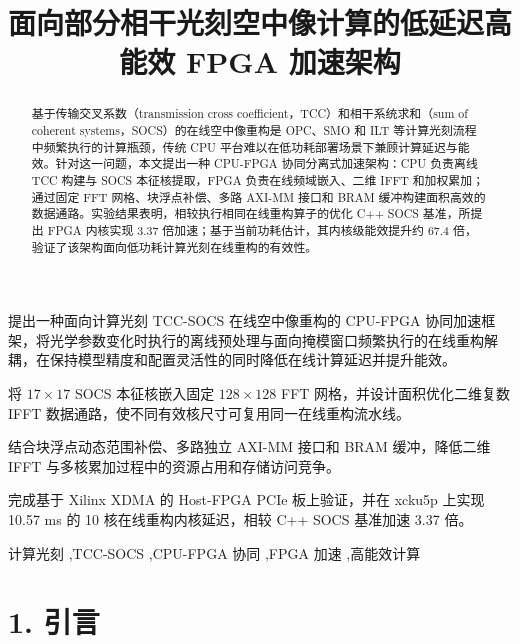 \documentclass[
  preprint]{elsarticle}
\title{面向部分相干光刻空中像计算的低延迟高能效 FPGA 加速架构}
\author{}
\date{}
\begin{document}
\begin{frontmatter}
\maketitle

\begin{highlights}

\item
  提出一种面向计算光刻 TCC-SOCS 在线空中像重构的 CPU-FPGA
  协同加速框架，将光学参数变化时执行的离线预处理与面向掩模窗口频繁执行的在线重构解耦，在保持模型精度和配置灵活性的同时降低在线计算延迟并提升能效。
\item
  将 \(17 \times 17\) SOCS 本征核嵌入固定 \(128 \times 128\) FFT
  网格，并设计面积优化二维复数 IFFT
  数据通路，使不同有效核尺寸可复用同一在线重构流水线。
\item
  结合块浮点动态范围补偿、多路独立 AXI-MM 接口和 BRAM 缓冲，降低二维
  IFFT 与多核累加过程中的资源占用和存储访问竞争。
\item
  完成基于 Xilinx XDMA 的 Host-FPGA PCIe 板上验证，并在 xcku5p 上实现
  10.57 ms 的 10 核在线重构内核延迟，相较 C++ SOCS 基准加速 3.37 倍。

\end{highlights}

\begin{abstract}

基于传输交叉系数（transmission cross coefficient，TCC）和相干系统求和（sum
of coherent systems，SOCS）的在线空中像重构是 OPC、SMO 和 ILT
等计算光刻流程中频繁执行的计算瓶颈，传统 CPU
平台难以在低功耗部署场景下兼顾计算延迟与能效。针对这一问题，本文提出一种
CPU-FPGA 协同分离式加速架构：CPU 负责离线 TCC 构建与 SOCS
本征核提取，FPGA 负责在线频域嵌入、二维 IFFT
和加权累加；通过固定 FFT 网格、块浮点补偿、多路 AXI-MM 接口和 BRAM
缓冲构建面积高效的数据通路。实验结果表明，相较执行相同在线重构算子的优化
C++ SOCS 基准，所提出 FPGA 内核实现 3.37
倍加速；基于当前功耗估计，其内核级能效提升约 67.4
倍，验证了该架构面向低功耗计算光刻在线重构的有效性。

\end{abstract}

\begin{keyword}
计算光刻 \sep TCC-SOCS \sep CPU-FPGA 协同 \sep FPGA 加速 \sep 高能效计算
\end{keyword}
\end{frontmatter}

\section{1. 引言}\label{ux5f15ux8a00}
\end{document}
